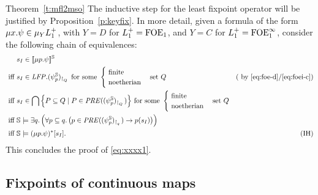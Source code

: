 \begin{proofof}{Theorem~\ref{t:mfl2mso}}
The inductive step for the least fixpoint operator will be justified by 
Proposition~\ref{p:keyfix}.
In more detail, given a formula of the form $\mu x. \psi \in\mu_{Y} L_{1}^{+}$,
with $Y=D$ for $L_{1}^{+} =\mathrm{FOE}_1$, and $Y=C$ for $L_{1}^{+} =\mathrm{FOE}^{\infty}_1$, 
consider the following chain of equivalences:
\begin{align*}
  & s_{I} \in \llbracket\mu p.\psi\rrbracket^{\mathbb{S}} 
\\ \text{ iff } 
  & s_{I} \in \mathit{LFP}. (\psi^{\mathbb{S}}_{p})_{{\upharpoonright}_{Q}\,} \text{ for some }
        \begin{cases} \text{ finite} & \\ \text{ noetherian} & 
	\end{cases} 
    \text{set } Q 
  & \text{( by \eqref{eq:foe-d}/\eqref{eq:foei-c})}
\\ \text{ iff } 
  &  s_{I} \in \bigcap \Big\{ P \subseteq Q \mid P \in 
         \mathit{PRE}((\psi^{\mathbb{S}}_{p})_{{\upharpoonright}_{Q}\,})\Big\} 
     \text{ for some }
        \begin{cases} \text{ finite} & \\ \text{ noetherian} & 
	\end{cases} 
     \text{set } Q 
\\ \text{ iff } & 
    \mathbb{S} \models \exists q.\, \Big(\forall p \subseteq q.\,
       \big(p \in \mathit{PRE}((\psi^{\mathbb{S}}_{p})_{{\upharpoonright}_{q}\,}) \to p(s_{I})\big)
       \Big)
\\ \text{ iff } & 
    \mathbb{S} \models (\mu p. \psi)^{*}[s_{I}].
   & (\text{IH})
\end{align*}
This concludes the proof of \eqref{eq:xxxx1}.
\end{proofof}
\subsection{Fixpoints of continuous maps}

